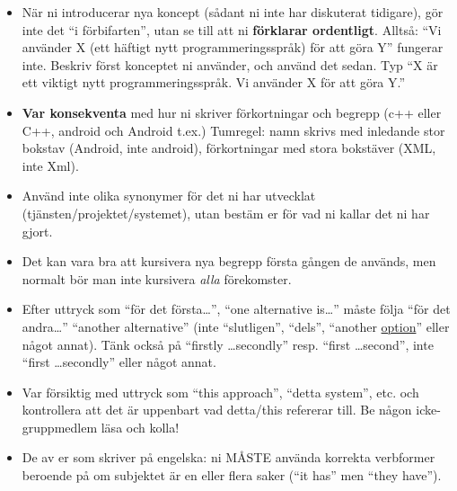\documentclass[a4paper,12pt]{article}
\begin{document}
\begin{itemize}
\item    När ni introducerar nya koncept (sådant ni inte har diskuterat tidigare), gör inte det ``i förbifarten'', utan se till att ni \textbf{förklarar ordentligt}.  Alltså: ``Vi använder X (ett häftigt nytt programmeringsspråk) för att göra Y'' fungerar inte.  Beskriv först konceptet ni använder, och använd det sedan.  Typ ``X är ett viktigt nytt programmeringsspråk.  Vi använder X för att göra Y.''

\item    \textbf{Var konsekventa} med hur ni skriver förkortningar och begrepp (c++ eller C++, android och Android t.ex.) Tumregel: namn skrivs med inledande stor bokstav (Android, inte android), förkortningar med stora bokstäver (XML, inte Xml).

\item    Använd inte olika synonymer för det ni har utvecklat (tjänsten/projektet/systemet), utan bestäm er för vad ni kallar det ni har gjort.

\item    Det kan vara bra att kursivera nya begrepp första gången de används, men normalt bör man inte kursivera \emph{alla} förekomster.

\item    Efter uttryck som ``för det första\ldots'', ``one alternative is\ldots'' måste följa ``för det andra\ldots'' ``another alternative'' (inte ``slutligen'', ``dels'', ``another \underline{option}'' eller något annat).  Tänk också på ``firstly \ldots secondly'' resp. ``first \ldots second'', inte ``first \ldots secondly'' eller något annat.

\item    Var försiktig med uttryck som ``this approach'', ``detta system'', etc. och kontrollera att det är uppenbart vad detta/this refererar till. Be någon icke-gruppmedlem läsa och kolla!

\item    De av er som skriver på engelska: ni MÅSTE använda korrekta verbformer beroende på om subjektet är en eller flera saker (``it has'' men ``they have'').
\end{itemize}
\end{document}
